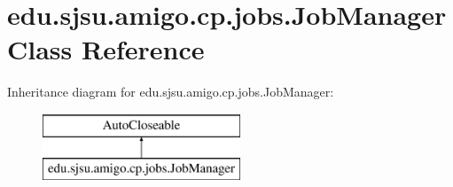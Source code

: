 \hypertarget{classedu_1_1sjsu_1_1amigo_1_1cp_1_1jobs_1_1_job_manager}{}\section{edu.\+sjsu.\+amigo.\+cp.\+jobs.\+Job\+Manager Class Reference}
\label{classedu_1_1sjsu_1_1amigo_1_1cp_1_1jobs_1_1_job_manager}
Inheritance diagram for edu.\+sjsu.\+amigo.\+cp.\+jobs.\+Job\+Manager\+:\begin{figure}[H]
\begin{center}
\leavevmode
\includegraphics[height=2.000000cm]{classedu_1_1sjsu_1_1amigo_1_1cp_1_1jobs_1_1_job_manager}
\end{center}
\end{figure}
